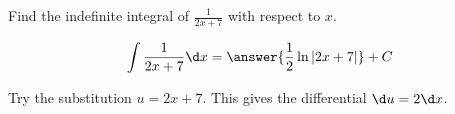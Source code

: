 \documentclass{ximera}
\author{Gregory Hartman \and Matthew Carr\and Nela Lakos}
\begin{document}
\begin{exercise}

Find the indefinite integral of $\frac{1}{2x+7}$ with respect to $x$.

\[
\int \frac{1}{2x+7} \d x=\answer{\frac{1}{2}\ln|2x+7|}+C
\]
\begin{hint}
	Try the substitution $u=2x+7$. This gives the differential $\d u=2\d x$.
\end{hint}
\end{exercise}
\end{document}
